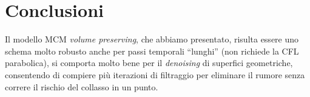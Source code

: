 \chapter*{Conclusioni}
{}

Il modello MCM \emph{volume preserving}, che abbiamo presentato,
risulta essere uno schema molto robusto anche per passi temporali
``lunghi'' (non richiede la CFL parabolica), si comporta molto bene
per il \emph{denoising} di superfici geometriche, consentendo di
compiere più iterazioni di filtraggio per eliminare il rumore senza
correre il rischio del collasso in un punto. 

